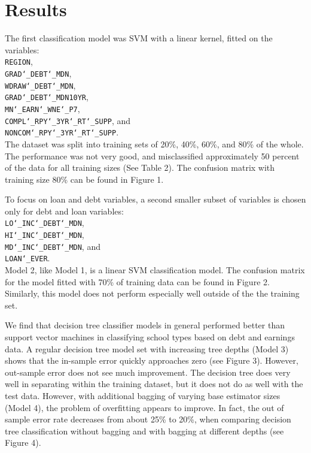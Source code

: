 \documentclass[10pt,twocolumn]{article}
\begin{document}
\section{Results}

The first classification model was SVM with a linear kernel, fitted on the variables:\\
\texttt{REGION},\\
\texttt{GRAD\char`_DEBT\char`_MDN},\\
\texttt{WDRAW\char`_DEBT\char`_MDN},\\
\texttt{GRAD\char`_DEBT\char`_MDN10YR},\\
\texttt{MN\char`_EARN\char`_WNE\char`_P7},\\
\texttt{COMPL\char`_RPY\char`_3YR\char`_RT\char`_SUPP}, and\\
\texttt{NONCOM\char`_RPY\char`_3YR\char`_RT\char`_SUPP}.\\

The dataset was split into
training sets of 20\%, 40\%, 60\%, and 80\% of the whole. The performance
was not very good, and misclassified approximately 50 percent of the data for all
training sizes (See Table 2). The confusion matrix with training size 80\% can be found
in Figure 1.

To focus on loan and debt variables, a second smaller subset of variables is chosen only
for debt and loan variables:\\

\texttt{LO\char`_INC\char`_DEBT\char`_MDN},\\
\texttt{HI\char`_INC\char`_DEBT\char`_MDN},\\
\texttt{MD\char`_INC\char`_DEBT\char`_MDN}, and\\
\texttt{LOAN\char`_EVER}.\\

Model 2, like Model 1, is a linear SVM classification model.
The confusion matrix for the model fitted with 70\% of training data can be found
in Figure 2. Similarly, this model does not perform especially well outside of the
the training set.

We find that decision tree classifier models in general performed better than
support vector machines in classifying school types based on debt and earnings data.
A regular decision tree model set with increasing tree depths (Model 3)
shows that the in-sample error quickly approaches zero (see Figure 3).
However, out-sample error does not see much improvement. The decision tree does
very well in separating within the training dataset, but it does not do as well
with the test data. However, with additional bagging of varying base estimator sizes (Model 4),
the problem of overfitting appears to improve. In fact, the out of sample error
rate decreases from about 25\% to 20\%, when comparing decision tree
classification without bagging and with bagging at different depths (see Figure 4).
\end{document}
